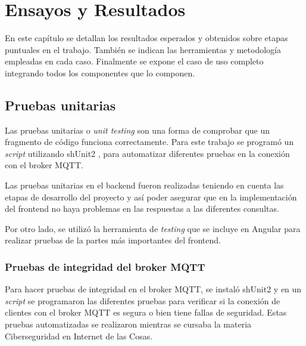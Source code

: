 
\chapter{Ensayos y Resultados} %
\label{Chapter4} %

En este capítulo se detallan los resultados esperados y obtenidos sobre etapas puntuales en el trabajo. También se indican las herramientas y metodología
empleadas en cada caso. Finalmente se expone el caso de uso completo integrando todos los componentes que lo componen.




\section{Pruebas unitarias}

Las pruebas unitarias o \textit{unit testing} son una forma de comprobar que un fragmento de código funciona correctamente. Para este trabajo se programó un \textit{script} utilizando  shUnit2 \citep{WEBSITE:44}, para automatizar diferentes pruebas en la conexión con el broker MQTT.  

Las pruebas unitarias en el backend fueron realizadas teniendo en cuenta las etapas de desarrollo del proyecto y así poder asegurar que en la implementación del frontend no haya problemas en las respuestas a las diferentes consultas.

Por otro lado, se utilizó la herramienta de \textit{testing} que se incluye en Angular para realizar pruebas de la partes más importantes del frontend. 




\subsection{Pruebas de integridad del broker MQTT}

Para hacer pruebas de integridad en el broker MQTT, se instaló shUnit2 y en un \textit{script} se programaron las diferentes pruebas para verificar si la conexión de clientes con el broker MQTT es segura o bien tiene fallas de seguridad. Estas pruebas automatizadas se realizaron mientras se cursaba la materia Ciberseguridad en Internet de las Cosas. 

